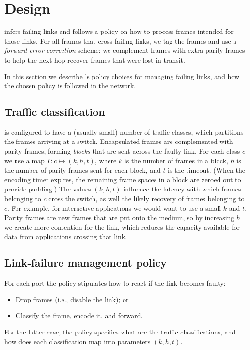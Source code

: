 \section{Design}
\label{sec:design}

\OurSys infers failing links and follows a policy on how to process frames
intended for those links. For all frames that cross failing links, we tag the
frames and use a \emph{forward error-correction} scheme: we complement frames
with extra parity frames to help the next hop recover frames that were lost in
transit.

In this section we describe \OurSys's policy choices for managing failing
links, and how the chosen policy is followed in the network.


\subsection{Traffic classification}
\label{sec:traffic-classification}
\OurSys is configured to have a (usually small) number of traffic classes,
which partitions the frames arriving at a switch. Encapsulated frames are
complemented with parity frames, forming \emph{blocks} that are sent across
the faulty link.
For each class $c$ we use a map $T: c \mapsto (k, h, t)$, where $k$ is the
number of frames in a block, $h$ is the number of parity frames sent for each
block, and $t$ is the timeout.
(When the encoding timer expires, the remaining frame spaces in a block are
zeroed out to provide padding.)
The values $(k, h, t)$ influence the latency with which frames belonging to $c$
cross the switch, as well the likely recovery of frames belonging to $c$. For
example, for interactive applications we would want to use a small $k$ and $t$.
Parity frames are new frames that are put onto the medium, so by
increasing $h$ we create more contention for the link, which reduces
the capacity available for data from applications crossing that link.

\subsection{Link-failure management policy}
\label{sec:policy}
For each port the policy stipulates how to react if the link becomes faulty:
  \begin{itemize}
    \item Drop frames (i.e., disable the link); or
    \item Classify the frame, encode it, and forward.
  \end{itemize}
For the latter case, the policy specifies what are the traffic classifications,
and how does each classification map into parameters $(k, h, t)$.

